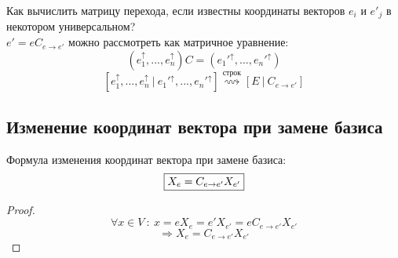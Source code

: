   \begin{algorithm}
    Как вычислить матрицу перехода, если известны координаты векторов $e_i$ и $e'_j$ в некотором универсальном?\\
    $e' = eC_{e \to e'}$ можно рассмотреть как матричное уравнение:
    $$(e_1^{\uparrow},...,e_n^{\uparrow})C = ({e_1'}^{\uparrow},...,{e_n'}^{\uparrow})$$
    $$[e_1^{\uparrow},...,e_n^{\uparrow} \ | \ {e_1'}^{\uparrow},...,{e_n'}^{\uparrow}] \overset{\text{строк}}{\rightsquigarrow} [E \ | \ C_{e \to e'}]$$   
  \end{algorithm}
  \subsection{Изменение координат вектора при замене базиса}
  \begin{theorem}
    Формула изменения координат вектора при замене базиса:
    \begin{equation}
      \fbox{$X_e = C_{e \to e'}X_{e'}$} 
    \end{equation}
  \end{theorem} 
  \begin{proof}
    $$\forall x \in V \ : \ x = eX_e = e'X_{e'} = eC_{e \to e'}X_{e'}$$
    $$\Longrightarrow  X_e = C_{e \to e'}X_{e'}$$ 
  \end{proof}